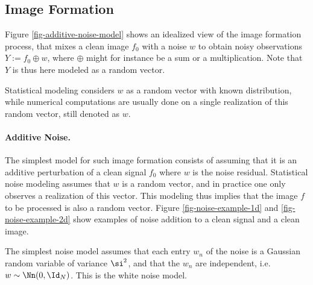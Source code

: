 \subsection{Image Formation}
\label{subsec-image-formation}

Figure \ref{fig-additive-noise-model} shows an idealized view of the image formation process, that mixes a clean image $f_0$ with a noise $w$ to obtain noisy observations $Y := f_0 \oplus w$, where $\oplus$ might for instance be a sum or a multiplication. Note that $Y$ is thus here modeled as a random vector. 


Statistical modeling considers $w$ as a random vector with known distribution, while numerical computations are usually done on a single realization of this random vector, still denoted as $w$.

\paragraph{Additive Noise.}

The simplest model for such image formation consists of assuming that it is an additive perturbation of a clean signal $f_0$
where $w$ is the noise residual. Statistical noise modeling assumes that $w$ is a random vector, and in practice one only observes a realization of this vector. This modeling thus implies that the image $f$ to be processed is also a random vector. Figure \ref{fig-noise-example-1d} and \ref{fig-noise-example-2d} show examples of noise addition to a clean signal and a clean image.




The simplest noise model assumes that each entry $w_n$ of the noise is a Gaussian random variable of variance $\si^2$, and that the $w_n$ are independent, i.e. $w \sim \Nn(0,\Id_N)$. This is the white noise model.

